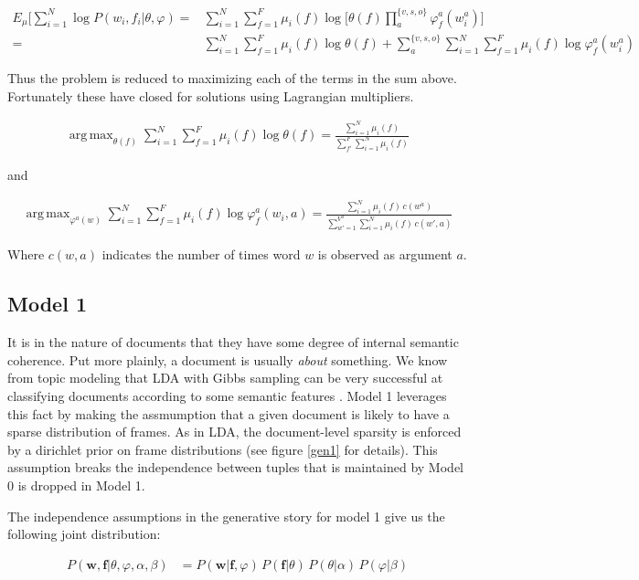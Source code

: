 \documentclass{article} %
\renewcommand\phi\varphi
\DeclareMathOperator*{\argmax}{arg\,max}
\begin{document}
\begin{align*}
E_\mu\big[\sum_{i=1}^N\log P(w_i,f_i|\theta,\phi)
=& \sum_{i=1}^N\sum_{f=1}^F\mu_i(f)\log\Big[\theta(f)\prod_a^{\{v,s,o\}}\phi_f^a(w_i^a)\Big]\\
=& \sum_{i=1}^N\sum_{f=1}^F\mu_i(f)\log\theta(f)
+ \sum_a^{\{v,s,o\}} \sum_{i=1}^N\sum_{f=1}^F\mu_i(f)\log \phi_f^a(w_i^a)
\end{align*}

Thus the problem is reduced to maximizing each of the terms in the sum above. Fortunately
these have closed for solutions using Lagrangian multipliers.


\begin{align}
\argmax_{\theta(f)}\sum_{i=1}^N\sum_{f=1}^F\mu_i(f)\log\theta(f)
= \frac{\sum_{i=1}^N\mu_i(f)}{\sum_{f'}^F\sum_{i=1}^N\mu_i(f)}
\end{align}

and

\begin{align}
\argmax_{\phi^a(w)}\sum_{i=1}^N\sum_{f=1}^F\mu_i(f)\log \phi_f^a(w_i,a)
= \frac{\sum_{i=1}^N \mu_i(f)\,c(w^a)}{\sum_{w'=1}^{V^a}\sum_{i=1}^N \mu_i(f)\,c(w',a)}
\end{align}

Where $c(w,a)$ indicates the number of times word $w$ is observed as argument $a$.

\subsection{Model 1}

It is in the nature of documents that they have some degree of internal semantic
coherence. Put more plainly, a document is usually \emph{about} something. We
know from topic modeling that LDA with Gibbs sampling can be very successful at
classifying documents according to some semantic features \citep{griffiths2004}.
Model 1 leverages this fact by making the assmumption that a given document is 
likely to have a sparse distribution of frames. As in LDA, the document-level
sparsity is enforced by a dirichlet prior on frame distributions (see figure
\ref{gen1} for details). This assumption breaks the independence between tuples 
that is maintained by Model 0 is dropped in Model 1.

The independence assumptions in the generative story for model 1 give us the 
following joint distribution:

\begin{align*}
P(\mathbf{w},\mathbf{f}|\theta,\phi,\alpha,\beta)
&=P(\mathbf{w}|\mathbf{f},\phi)\,P(\mathbf{f}|\theta)\,P(\theta|\alpha)\,P(\phi|\beta)
\end{align*}
\end{document}
